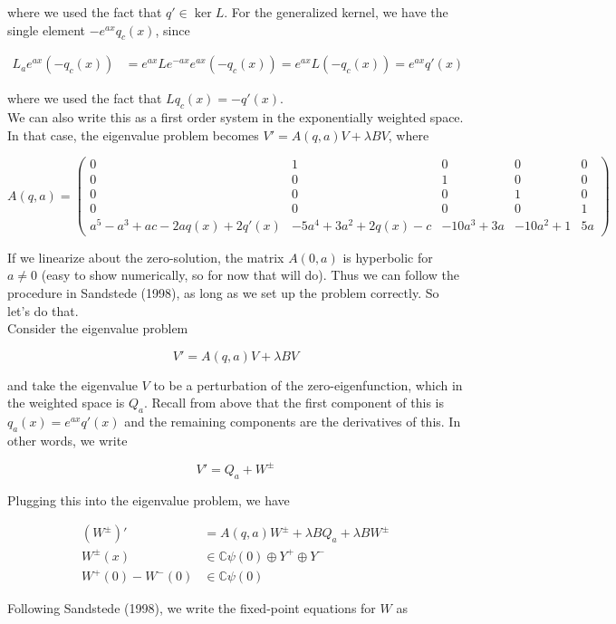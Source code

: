 \documentclass[12pt]{article}
\def\C{{\mathbb C}}
\begin{document}
where we used the fact that $q' \in \ker L$. For the generalized kernel, we have the single element $-e^{ax} q_c(x)$, since

\begin{align*}
L_a e^{ax} (-q_c(x)) &= e^{ax} L e^{-ax} e^{ax} (-q_c(x)) = e^{ax} L (-q_c(x)) = e^{ax} q'(x)
\end{align*}

where we used the fact that $L q_c(x) = -q'(x)$.\\

We can also write this as a first order system in the exponentially weighted space. In that case, the eigenvalue problem becomes $V' = A(q, a)V + \lambda B V$, where

\[
A(q, a) = 
\begin{pmatrix}0 & 1 & 0 & 0 & 0 \\0 & 0 & 1 & 0 & 0 \\0 & 0 & 0 & 1 & 0 \\0 & 0 & 0 & 0 & 1 \\
a^5 - a^3 + a c - 2 a q(x) + 2q'(x) & -5a^4 + 3a^2 + 2q(x) - c & -10a^3 + 3a & -10a^2 + 1 & 5a \end{pmatrix} 
\]

If we linearize about the zero-solution, the matrix $A(0, a)$ is hyperbolic for $a \neq 0$ (easy to show numerically, so for now that will do). Thus we can follow the procedure in Sandstede (1998), as long as we set up the problem correctly. So let's do that.\\

Consider the eigenvalue problem

\[
V' = A(q, a)V + \lambda B V
\]

and take the eigenvalue $V$ to be a perturbation of the zero-eigenfunction, which in the weighted space is $Q_a$. Recall from above that the first component of this is $q_a(x) = e^{ax} q'(x)$ and the remaining components are the derivatives of this. In other words, we write

\[
V' = Q_a + W^\pm
\]

Plugging this into the eigenvalue problem, we have

\begin{align*}
(W^\pm)' &= A(q, a)W^\pm + \lambda B Q_a + \lambda B W^\pm \\
W^\pm(x) &\in \C \psi(0) \oplus Y^+ \oplus Y^- \\
W^+(0) - W^-(0) &\in \C \psi(0) 
\end{align*}

Following Sandstede (1998), we write the fixed-point equations for $W$ as 
\end{document}
